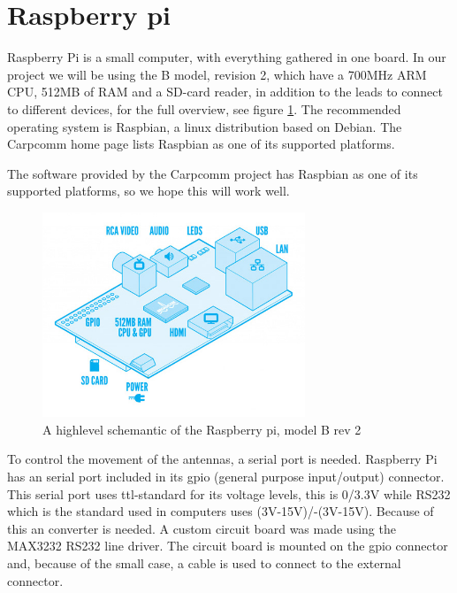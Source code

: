 \section{Raspberry pi}
Raspberry Pi is a small computer, with everything gathered in one board. In our project we will be using the B model, revision 2, which have a 700MHz ARM CPU, 512MB of RAM and a SD-card reader, in addition to the leads to connect to different devices, for  the full overview, see figure \ref{fig:raspberrypihighlevel}. The recommended operating system is Raspbian, a linux distribution based on Debian. The Carpcomm home page lists Raspbian as one of its supported platforms.

The software provided by the Carpcomm project has Raspbian as one of its supported platforms, so we hope this will work well.

\begin{figure}
	\begin{center}
		\includegraphics[width=0.7\textwidth]{Figures/raspberrypi_modelb_hl.jpg}
	\end{center}
	\caption[Raspberry pi highlevel]{A highlevel schemantic of the Raspberry pi, model B rev 2}
	\label{fig:raspberrypihighlevel}
\end{figure}

To control the movement of the antennas, a serial port is needed. Raspberry Pi has an serial port included in its gpio (general purpose input/output) connector. This serial port uses ttl-standard for its voltage levels, this is 0/3.3V while RS232 which is the standard used in computers uses (3V-15V)/-(3V-15V). Because of this an converter is needed. A custom circuit board was made using the MAX3232 RS232 line driver.%
The circuit board is mounted on the gpio connector and, because of the small case, a cable is used to connect to the external connector.


